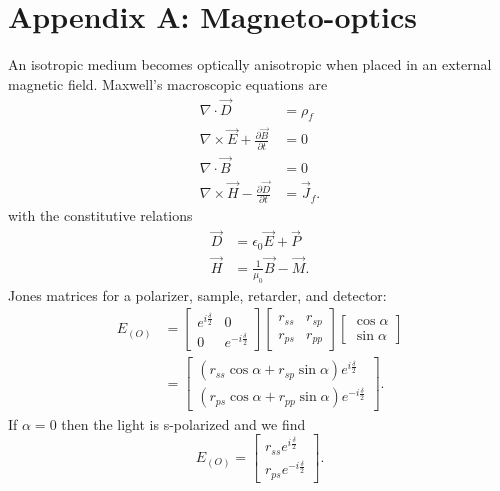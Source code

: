 \documentclass{article}
\begin{document}
\section{Appendix A: Magneto-optics}
An isotropic medium becomes optically anisotropic when placed in an external magnetic field.
%
Maxwell's macroscopic equations are
\begin{align}
\nabla \cdot \vec{D} &= \rho_{f} \\
\nabla \times \vec{E} + \frac{\partial \vec{B}}{\partial t} &= 0 \\
\nabla \cdot \vec{B} &= 0 \\
\nabla \times \vec{H} - \frac{\partial \vec{D}}{\partial t} &= \vec{J}_{f}.
\end{align}
with the constitutive relations
\begin{align}
\vec{D} &= \epsilon_{0} \vec{E} + \vec{P} \\
\vec{H} &= \frac{1}{\mu_{0}} \vec{B} - \vec{M}.
\end{align}
%
Jones matrices for a polarizer, sample, retarder, and detector:
\begin{align}
E_{(O)} &= \left[ \begin{matrix} e^{i \frac{\delta}{2}}&0\\ 0&e^{-i \frac{\delta}{2}} \end{matrix} \right] \left[ \begin{matrix} r_{ss}&r_{sp}\\ r_{ps}&r_{pp} \end{matrix} \right] \left[ \begin{matrix} \cos{\alpha}\\ \sin{\alpha} \end{matrix} \right] \\
&= \left[ \begin{matrix}(r_{ss} \cos{\alpha} + r_{sp} \sin{\alpha}) e^{i \frac{\delta}{2}} \\(r_{ps} \cos{\alpha} + r_{pp} \sin{\alpha}) e^{-i \frac{\delta}{2}} \end{matrix} \right].
\end{align}
If $\alpha = 0$ then the light is s-polarized and we find
\begin{equation}
E_{(O)} = \left[ \begin{matrix} r_{ss} e^{i \frac{\delta}{2}}\\ r_{ps} e^{-i \frac{\delta}{2}} \end{matrix} \right].
\end{equation}
\end{document}
